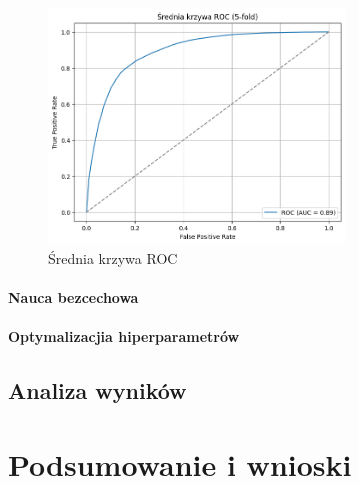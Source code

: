 \documentclass[a4paper,twoside,12pt]{book}
\begin{document}
\begin{figure}[!h]
	\centering
	\includegraphics[width=0.7\textwidth]{img/roc_kfold_feature.png}
	\caption{Średnia krzywa ROC}
	\label{fig:etykieta-rysunku}
\end{figure}

\subsubsection*{Nauca bezcechowa}
\subsubsection*{Optymalizacjia hiperparametrów}
\section{Analiza wyników}

\chapter{Podsumowanie i wnioski}



\end{document}
